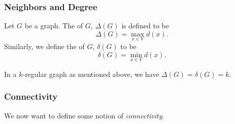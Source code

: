 \documentclass[11pt, mathserif]{beamer}
\theoremstyle{definition}
\theoremstyle{remark}
\begin{document}
\begin{frame}
  \frametitle{Neighbors and Degree}

  \begin{definition}
    Let $G$ be a graph. The  of $G$, $\Delta(G)$ is defined to be 
    $$\Delta(G) = \max_{x \in V} d(x).$$
    Similarly, we define the  of $G$, $\delta(G)$ to be 
    $$\delta(G) = \min_{x \in V} d(x).$$
  \end{definition}
  
  In a $k$-regular graph as mentioned above, we have $\Delta(G) = \delta(G) = k$.

\end{frame}

\begin{frame}
  \frametitle{Connectivity}

  We now want to define some notion of \emph{connectivity}.


\begin{center}

	


\begin{tikzpicture}[x=0.75pt,y=0.75pt,yscale=-1,xscale=1]


\end{tikzpicture}
\end{center}
\end{frame}
\end{document}
